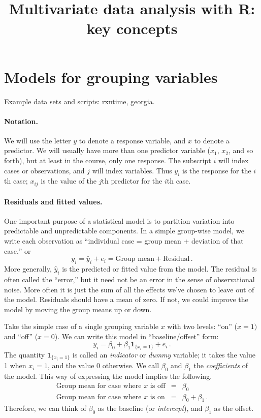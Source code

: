 \documentclass[11pt]{article}
\title{Multivariate data analysis with R: key concepts}
\date{}  %
\newcommand{\1}[1]{\mathbf{1}_{\{ {#1} \}}}
\begin{document}

\maketitle%


\section{Models for grouping variables}
Example data sets and scripts: rxntime, georgia.

\paragraph{Notation.} We will use the letter $y$ to denote a response variable, and $x$ to denote a predictor.  We will usually have more than one predictor variable ($x_1$, $x_2$, and so forth), but at least in the course, only one response.  The subscript $i$ will index cases or observations, and $j$ will index variables.  Thus $y_i$ is the response for the $i$th case; $x_{ij}$ is the value of the $j$th predictor for the $i$th case.

\paragraph{Residuals and fitted values.}  One important purpose of a statistical model is to partition variation into predictable and unpredictable components.  In a simple group-wise model, we write each observation as ``individual case = group mean + deviation of that case,'' or
$$
y_i = \hat{y}_i + e_i = \mbox{Group mean} + \mbox{Residual} \, .
$$
More generally, $\hat{y}_i$ is the predicted or fitted value from the model.  The residual is often called the ``error,'' but it need not be an error in the sense of observational noise.  More often it is just the sum of all the effects we've chosen to leave out of the model.  Residuals should have a mean of zero.  If not, we could improve the model by moving the group means up or down.

Take the simple case of a single grouping variable $x$ with two levels: ``on'' ($x=1)$ and ``off'' ($x=0$).  We can write this model in ``baseline/offset'' form:
$$
y_i = \beta_0 + \beta_1 \1{x_i=1} + e_i \, .
$$
The quantity $\1{x_i=1}$ is called an \textit{indicator} or \textit{dummy} variable; it takes the value 1 when $x_i=1$, and the value 0 otherwise.   We call $\beta_0$ and $\beta_1$ the \textit{coefficients} of the model.  This way of expressing the model implies the following.
\begin{eqnarray*}
\mbox{Group mean for case where $x$ is off} &=& \beta_0 \\
\mbox{Group mean for case where $x$ is on} &=& \beta_0 + \beta_1 \, .
\end{eqnarray*}
Therefore, we can think of $\beta_0$ as the baseline (or \textit{intercept}), and $\beta_1$ as the offset.
\end{document}
